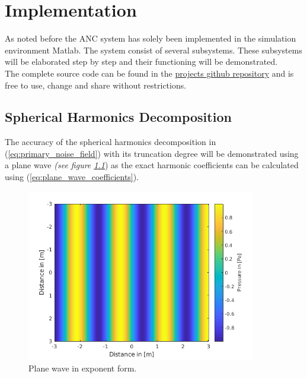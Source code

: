 \chapter{Implementation}

As noted before the ANC system has solely been implemented in the simulation environment Matlab. The system consist of several subsystems. These subsystems will be elaborated step by step and their functioning will be demonstrated.\\
The complete source code can be found in the \color{blue}\href{https://github.com/leonardberresheim/MA---Active-Noise-Control-in-Spatial-Domains/tree/main/Matlab}{projects github repository} \color{black} and is free to use, change and share without restrictions.



\section{Spherical Harmonics Decomposition}
The accuracy of the spherical harmonics decomposition in (\ref{eq:primary_noise_field}) with its truncation degree will be demonstrated using a plane wave \textit{(see figure \ref{fig:planeWaveExp}}) as the exact harmonic coefficients can be calculated using (\ref{eq:plane_wave_coefficients}).

\begin{figure}[H]
    \centerline{\includegraphics[width=100mm,keepaspectratio]{LaTeX/images/plots/plane_Wave_exponent_form.png}}
    \caption{Plane wave in exponent form.}
    \label{fig:planeWaveExp}
\end{figure}

